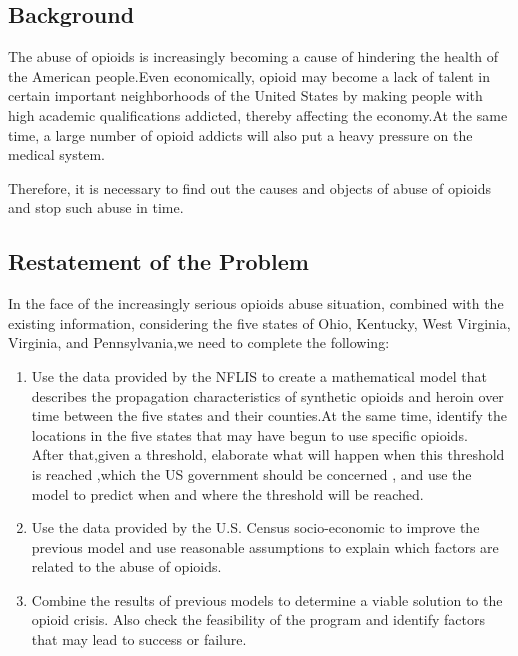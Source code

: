 \documentclass[12pt]{mcmthesis}
\begin{document}
\subsection{Background}
The abuse of opioids is increasingly becoming a cause of hindering the health of the American people.Even economically, opioid may become a lack of talent in certain important neighborhoods of the United States by making people with high academic qualifications addicted, thereby affecting the economy.At the same time, a large number of opioid addicts will also put a heavy pressure on the medical system.\par Therefore, it is necessary to find out the causes and objects of abuse of opioids and stop such abuse in time.
\subsection{Restatement of the Problem}
In the face of the increasingly serious opioids abuse situation, combined with the existing information, considering the five states of Ohio, Kentucky, West Virginia, Virginia, and Pennsylvania,we need to complete the following:
\begin{enumerate}
\item Use the data provided by the NFLIS to create a mathematical model that describes the propagation characteristics of synthetic opioids and heroin over time between the five states and their counties.At the same time, identify the locations in the five states that may have begun to use specific opioids.\\After that,given a threshold, elaborate what will happen when this threshold is reached ,which the US government should be concerned , and use the model to predict when and where the threshold will be reached.
\item Use the data provided by the U.S. Census socio-economic to improve the previous model and use reasonable assumptions to explain which factors are related to the abuse of opioids.
\item Combine the results of previous models to determine a viable solution to the opioid crisis. Also check the feasibility of the program and identify factors that may lead to success or failure.
\end{enumerate}
\end{document}
